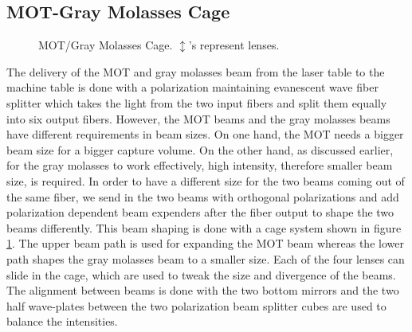 \subsection{MOT-Gray Molasses Cage}\label{exp:mot-cage}
\begin{figure}
  \begin{center}
  \end{center}
  \caption{MOT/Gray Molasses Cage. $\updownarrow$'s represent lenses.}
  \label{mot-cage-design}
\end{figure}
The delivery of the MOT and gray molasses beam from the laser table to the machine table is done with a polarization maintaining evanescent wave fiber splitter which takes the light from the two input fibers and split them equally into six output fibers. However, the MOT beams and the gray molasses beams have different requirements in beam sizes. On one hand, the MOT needs a bigger beam size for a bigger capture volume. On the other hand, as discussed earlier, for the gray molasses to work effectively, high intensity, therefore smaller beam size, is required. In order to have a different size for the two beams coming out of the same fiber, we send in the two beams with orthogonal polarizations and add polarization dependent beam expenders after the fiber output to shape the two beams differently. This beam shaping is done with a cage system shown in figure \ref{mot-cage-design}. The upper beam path is used for expanding the MOT beam whereas the lower path shapes the gray molasses beam to a smaller size. Each of the four lenses can slide in the cage, which are used to tweak the size and divergence of the beams. The alignment between beams is done with the two bottom mirrors and the two half wave-plates between the two polarization beam splitter cubes are used to balance the intensities.

